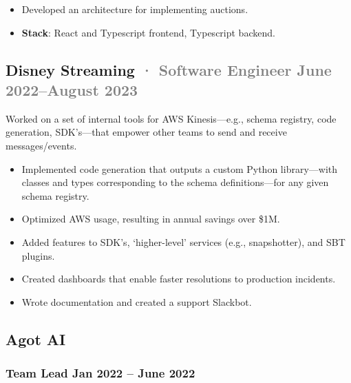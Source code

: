 \documentclass[12pt]{article} %
\providecommand{\tightlist}{%
  \setlength{\itemsep}{0pt}\setlength{\parskip}{0pt}}
\renewcommand{\emph}[1]{%
  \textcolor{gray}{#1}%
}
\begin{document}
\begin{itemize}
\tightlist
\item
  Developed an architecture for implementing auctions.
\item
  \textbf{Stack}: React and Typescript frontend, Typescript backend.
\end{itemize}

\hypertarget{disney-streaming-software-engineer-june-2022august-2023}{%
\subsection{\texorpdfstring{Disney Streaming \emph{· \small Software
Engineer \hfill June 2022--August
2023}}{Disney Streaming · Software Engineer June 2022--August 2023}}\label{disney-streaming-software-engineer-june-2022august-2023}}

Worked on a set of internal tools for AWS Kinesis---e.g., schema
registry, code generation, SDK's---that empower other teams to send and
receive messages/events.

\begin{itemize}
\tightlist
\item
  Implemented code generation that outputs a custom Python
  library---with classes and types corresponding to the schema
  definitions---for any given schema registry.
\item
  Optimized AWS usage, resulting in annual savings over \$1M.
\item
  Added features to SDK's, `higher-level' services (e.g., snapshotter),
  and SBT plugins.
\item
  Created dashboards that enable faster resolutions to production
  incidents.
\item
  Wrote documentation and created a support Slackbot.
\end{itemize}

\hypertarget{agot-ai}{%
\subsection{Agot AI}\label{agot-ai}}

\vspace{-5pt}

\hypertarget{team-lead-jan-2022-june-2022}{%
\subsubsection{\texorpdfstring{\small Team Lead \hfill Jan 2022 -- June
2022}{Team Lead Jan 2022 -- June 2022}}\label{team-lead-jan-2022-june-2022}}
\end{document}
